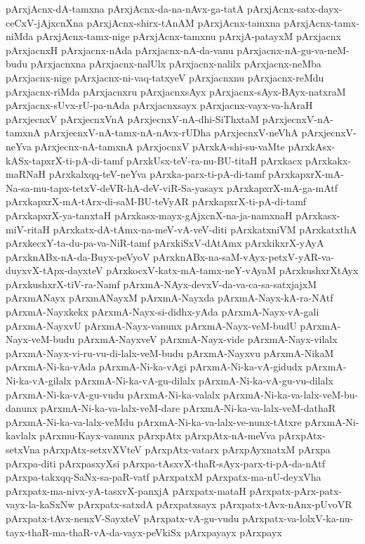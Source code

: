 {pArxjAcnx-dA-tamxna
pArxjAcnx-da-na-nAvx-ga-tatA
pArxjAcnx-satx-dayx-ceCxV-jAjxcnXna
pArxjAcnx-shirx-tAnAM
pArxjAcnx-tamxna
pArxjAcnx-tamx-niMda
pArxjAcnx-tamx-nige
pArxjAcnx-tamxnu
pArxjA-patayxM
pArxjacnx
pArxjacnxH
pArxjacnx-nAda
pArxjacnx-nA-da-vanu
pArxjacnx-nA-gu-va-neM-budu
pArxjacnxna
pArxjacnx-nalUlx
pArxjacnx-nalilx
pArxjacnx-neMba
pArxjacnx-nige
pArxjacnx-ni-vaq-tatxyeV
pArxjacnxnu
pArxjacnx-reMdu
pArxjacnx-riMda
pArxjacnxru
pArxjacnxsAyx
pArxjacnx-sAyx-BAyx-natxraM
pArxjacnx-sUvx-rU-pa-nAda
pArxjacnxsayx
pArxjacnx-vayx-va-hAraH
pArxjecnxV
pArxjecnxVnA
pArxjecnxV-nA-dhi-SiThxtaM
pArxjecnxV-nA-tamxnA
pArxjecnxV-nA-tamx-nA-nAvx-rUDha
pArxjecnxV-neVhA
pArxjecnxV-neYva
pArxjecnx-nA-tamxnA
pArxjocnxV
pArxkA-shi-su-vaMte
pArxkAsx-kASx-tapxrX-ti-pA-di-tamf
pArxkUsx-teV-ra-nu-BU-titaH
pArxkacx
pArxkakx-maRNaH
pArxkalxqq-teV-neYva
pArxka-parx-ti-pA-di-tamf
pArxkapxrX-mA-Na-sa-mu-tapx-tetxV-deVR-hA-deV-viR-Sa-yasayx
pArxkapxrX-mA-ga-mAtf
pArxkapxrX-mA-tArx-di-saM-BU-teVyAR
pArxkapxrX-ti-pA-di-tamf
pArxkapxrX-ya-tanxtaH
pArxkasx-mayx-gAjxcnX-na-ja-namxnaH
pArxkasx-miV-ritaH
pArxkatx-dA-tAmx-na-meV-vA-veV-diti
pArxkatxniVM
pArxkatxthA
pArxkecxY-ta-du-pa-va-NiR-tamf
pArxkiSxV-dAtAmx
pArxkikxrX-yAyA
pArxknABx-nA-da-Buyx-peVyoV
pArxknABx-na-saM-vAyx-petxV-yAR-va-duyxvX-tApx-dayxteV
pArxkocxV-katx-mA-tamx-neY-vAyaM
pArxkushxrXtAyx
pArxkushxrX-tiV-ra-Namf
pArxmA-NAyx-devxV-da-va-ca-sa-satxjajxM
pArxmANayx
pArxmANayxM
pArxmA-Nayxda
pArxmA-Nayx-kA-ra-NAtf
pArxmA-Nayxkekx
pArxmA-Nayx-si-didhx-yAda
pArxmA-Nayx-vA-gali
pArxmA-NayxvU
pArxmA-Nayx-vanunx
pArxmA-Nayx-veM-budU
pArxmA-Nayx-veM-budu
pArxmA-NayxveV
pArxmA-Nayx-vide
pArxmA-Nayx-vilalx
pArxmA-Nayx-vi-ru-vu-di-lalx-veM-budu
pArxmA-Nayxvu
pArxmA-NikaM
pArxmA-Ni-ka-vAda
pArxmA-Ni-ka-vAgi
pArxmA-Ni-ka-vA-gidudx
pArxmA-Ni-ka-vA-gilalx
pArxmA-Ni-ka-vA-gu-dilalx
pArxmA-Ni-ka-vA-gu-vu-dilalx
pArxmA-Ni-ka-vA-gu-vudu
pArxmA-Ni-ka-valalx
pArxmA-Ni-ka-va-lalx-veM-bu-danunx
pArxmA-Ni-ka-va-lalx-veM-dare
pArxmA-Ni-ka-va-lalx-veM-dathaR
pArxmA-Ni-ka-va-lalx-veMdu
pArxmA-Ni-ka-va-lalx-ve-nunx-tAtxre
pArxmA-Ni-kavlalx
pArxmu-Kayx-vanunx
pArxpAtx
pArxpAtx-nA-meVva
pArxpAtx-setxVna
pArxpAtx-setxvXVteV
pArxpAtx-vatarx
pArxpAyxnatxM
pArxpa
pArxpa-diti
pArxpasxyXsi
pArxpa-tAsxvX-thaR-sAyx-parx-ti-pA-da-nAtf
pArxpa-takxqq-SaNx-sa-paR-vatf
pArxpatxM
pArxpatx-ma-nU-deyxVha
pArxpatx-ma-nivx-yA-tasxvX-panxjA
pArxpatx-mataH
pArxpatx-pArx-patx-vayx-la-kaSxNw
pArxpatx-satxdA
pArxpatxsayx
pArxpatx-tAvx-nAnx-pUvoVR
pArxpatx-tAvx-nenxV-SayxteV
pArxpatx-vA-gu-vudu
pArxpatx-va-lolxV-ka-nu-tayx-thaR-ma-thaR-vA-da-vayx-peVkiSx
pArxpayayx
pArxpayx
}
